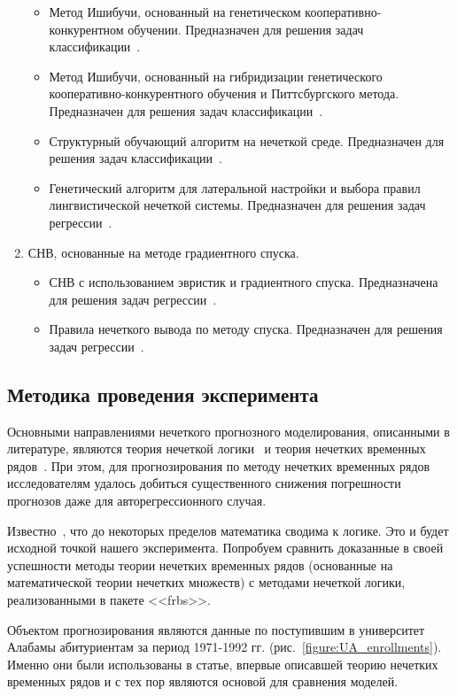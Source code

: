 \begin{enumerate}
\begin{itemize}
	\item Метод Ишибучи, основанный на генетическом кооперативно-кон\-курентном обучении. Предназначен для решения задач классификации~\cite{Ishibuchi1999}.
	\item Метод Ишибучи, основанный на гибридизации генетического ко\-оперативно-конкурентного обучения и Питтсбургского метода. 
	 Предназначен для решения задач классификации~\cite{Ishibuchi2005}.
	\item Структурный обучающий алгоритм на нечеткой среде.  
	Предназначен для решения задач классификации~\cite{Gonzalez2001}. 
	\item Генетический алгоритм для латеральной настройки и выбора правил лингвистической нечеткой системы. 
	Предназначен для решения задач регрессии~\cite{Alcala2007}.
\end{itemize}
\item СНВ, основанные на методе градиентного спуска.
\begin{itemize}
	\item СНВ с использованием эвристик и градиентного спуска. Предназначена для решения задач регрессии~\cite{Ishibuchi1994}.
	\item Правила нечеткого вывода по методу спуска. 
	Предназначен для решения задач регрессии~\cite{Nomura1992}. 
\end{itemize}
\end{enumerate}

\subsection{Методика проведения эксперимента}

Основными направлениями нечеткого прогнозного моделирования, описанными в
литературе, являются теория нечеткой логики~\cite{Zadeh1973} и теория нечетких
временных рядов~\cite{Song1993}.  При этом, для прогнозирования по методу
нечетких временных рядов исследователям удалось добиться существенного снижения
погрешности прогнозов даже для авторегрессионного случая. 

Известно~\cite{sep-principia-mathematica}, что до некоторых пределов математика
сводима к логике. Это и будет исходной точкой нашего эксперимента. Попробуем
сравнить доказанные в своей успешности методы теории нечетких временных рядов
(основанные на математической теории нечетких множеств) с методами нечеткой
логики, реализованными в пакете <<frbs>>.  

Объектом прогнозирования являются данные по поступившим в университет Алабамы абитуриентам за период 1971-1992 гг. (рис.~\ref{figure:UA_enrollments}). Именно они были использованы в статье, впервые описавшей теорию нечетких временных рядов и с тех пор являются основой для сравнения моделей.  


